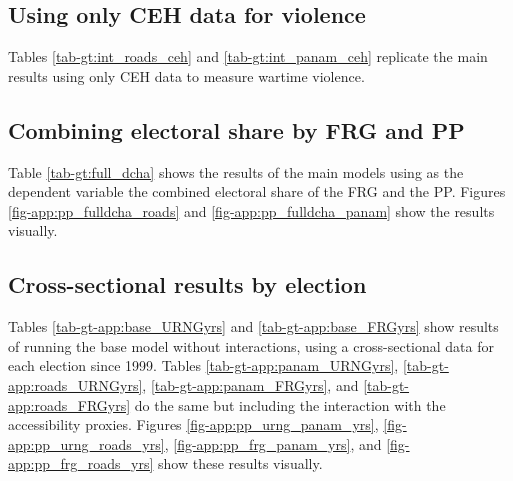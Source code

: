 \documentclass[a4paper, 12pt, notitlepage]{article}
\begin{document}
\subsection{Using only CEH data for violence}

Tables \ref{tab-gt:int_roads_ceh} and \ref{tab-gt:int_panam_ceh} replicate the main results using only CEH data to measure wartime violence.

\subsection{Combining electoral share by FRG and PP}

Table \ref{tab-gt:full_dcha} shows the results of the main models using as the dependent variable the combined electoral share of the FRG and the PP.
Figures \ref{fig-app:pp_fulldcha_roads} and \ref{fig-app:pp_fulldcha_panam} show the results visually.

\subsection{Cross-sectional results by election}

Tables \ref{tab-gt-app:base_URNGyrs} and \ref{tab-gt-app:base_FRGyrs} show results of running the base model without interactions, using a cross-sectional data for each election since 1999.
Tables \ref{tab-gt-app:panam_URNGyrs}, \ref{tab-gt-app:roads_URNGyrs}, \ref{tab-gt-app:panam_FRGyrs}, and \ref{tab-gt-app:roads_FRGyrs} do the same but including the interaction with the accessibility proxies.
Figures \ref{fig-app:pp_urng_panam_yrs}, \ref{fig-app:pp_urng_roads_yrs}, \ref{fig-app:pp_frg_panam_yrs}, and \ref{fig-app:pp_frg_roads_yrs} show these results visually.

%
%
\end{document}
